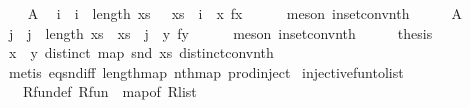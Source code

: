 \begin{isabellebody}
\ \ \isamarkupfalse%
\ A{}\ \isamarkupfalse%
\ i\ \ {\isachardoublequoteopen}i\ {\isacharless}{\kern0pt}\ length\ xs{\isachardoublequoteclose}\ \ \ {\isachardoublequoteopen}xs\ {\isacharbang}{\kern0pt}\ i\ {\isacharequal}{\kern0pt}\ {\isacharparenleft}{\kern0pt}x{\isacharcomma}{\kern0pt}\ fx{\isacharparenright}{\kern0pt}{\isachardoublequoteclose}\isanewline
\ \ \ \ \isamarkupfalse%
\ {\isacharparenleft}{\kern0pt}meson\ in{\isacharunderscore}{\kern0pt}set{\isacharunderscore}{\kern0pt}conv{\isacharunderscore}{\kern0pt}nth{\isacharparenright}{\kern0pt}\isanewline
\ \ \isamarkupfalse%
\ \isamarkupfalse%
\ A{}\ \isamarkupfalse%
\ j\ \ {\isachardoublequoteopen}j\ {\isacharless}{\kern0pt}\ length\ xs{\isachardoublequoteclose}\ \ {\isachardoublequoteopen}xs\ {\isacharbang}{\kern0pt}\ j\ {\isacharequal}{\kern0pt}\ {\isacharparenleft}{\kern0pt}y{\isacharcomma}{\kern0pt}\ fy{\isacharparenright}{\kern0pt}{\isachardoublequoteclose}\isanewline
\ \ \ \ \isamarkupfalse%
\ {\isacharparenleft}{\kern0pt}meson\ in{\isacharunderscore}{\kern0pt}set{\isacharunderscore}{\kern0pt}conv{\isacharunderscore}{\kern0pt}nth{\isacharparenright}{\kern0pt}\isanewline
\ \ \isamarkupfalse%
\ \isamarkupfalse%
\ {\isacharquery}{\kern0pt}thesis\ \isamarkupfalse%
\ {\isacartoucheopen}x\ {\isasymnoteq}\ y{\isacartoucheclose}\ {\isacartoucheopen}distinct\ {\isacharparenleft}{\kern0pt}map\ snd\ xs{\isacharparenright}{\kern0pt}{\isacartoucheclose}\ distinct{\isacharunderscore}{\kern0pt}conv{\isacharunderscore}{\kern0pt}nth\isanewline
\ \ \ \ \isamarkupfalse%
\ {\isacharparenleft}{\kern0pt}metis\ eq{\isacharunderscore}{\kern0pt}snd{\isacharunderscore}{\kern0pt}iff\ length{\isacharunderscore}{\kern0pt}map\ nth{\isacharunderscore}{\kern0pt}map\ prod{\isachardot}{\kern0pt}inject{\isacharparenright}{\kern0pt}\isanewline
{}\isamarkupfalse%
%
\endisatagproof
{\isafoldproof}%
%
\isadelimproof
\isanewline
%
\endisadelimproof
\isanewline
{}\isamarkupfalse%
\ injective{\isacharunderscore}{\kern0pt}fun{\isacharunderscore}{\kern0pt}to{\isacharunderscore}{\kern0pt}list{\isacharcolon}{\kern0pt}\isanewline
\ \ \ R{\isacharunderscore}{\kern0pt}fun{\isacharunderscore}{\kern0pt}def{\isacharcolon}{\kern0pt}\ {\isachardoublequoteopen}R{\isacharunderscore}{\kern0pt}fun\ {\isacharequal}{\kern0pt}\ map{\isacharunderscore}{\kern0pt}of\ R{\isacharunderscore}{\kern0pt}list{\isachardoublequoteclose}\ \isanewline

\end{isabellebody}
